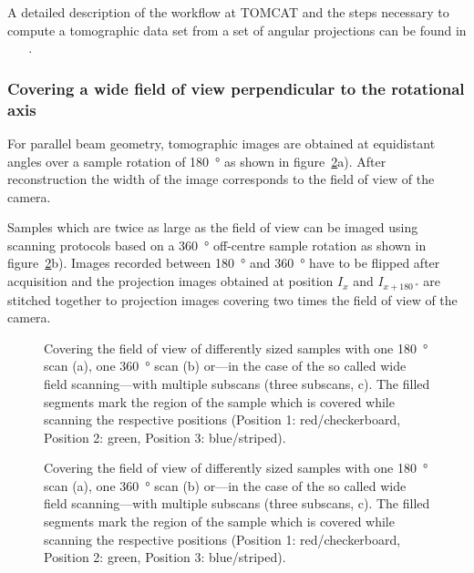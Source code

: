 A detailed description of the workflow at TOMCAT and the steps necessary to compute a tomographic data set from a set of angular projections can be found in%
\ifhtml
	~\citet{Hintermueller2009}
\else
	~
\fi%
.

\subsubsection{Covering a wide field of view perpendicular to the rotational axis}%
For parallel beam geometry, tomographic images are obtained at equidistant angles over a sample rotation of \SI{180}{\degree} as shown in figure~\ref{fig:scanning-possibilities}a). After reconstruction the width of the image corresponds to the field of view of the camera.

Samples which are twice as large as the field of view can be imaged using scanning protocols based on a \SI{360}{\degree} off-centre sample rotation as shown in figure~\ref{fig:scanning-possibilities}b). Images recorded between \SI{180}{\degree} and \SI{360}{\degree} have to be flipped after acquisition and the projection images obtained at position $I_{x}$ and $I_{x+\SI{180}{\degree}}$ are stitched together to projection images covering two times the field of view of the camera.

\ifiucr
	\begin{figure}
		\centering
		\caption{Covering the field of view of differently sized samples with one \SI{180}{\degree} scan (a), one \SI{360}{\degree} scan (b) or---in the case of the so called wide field scanning---with multiple subscans (three subscans, c). The filled segments mark the region of the sample which is covered while scanning the respective positions (Position 1: red/checkerboard, Position 2: green, Position 3: blue/striped).}%
		\label{fig:scanning-possibilities}%
	\end{figure}
\else
	\begin{figure}
		\label{subfig:scanning-possibilities}%
		\caption{Covering the field of view of differently sized samples with one \SI{180}{\degree} scan (a), one \SI{360}{\degree} scan (b) or---in the case of the so called wide field scanning---with multiple subscans (three subscans, c). The filled segments mark the region of the sample which is covered while scanning the respective positions (Position 1: red/checkerboard, Position 2: green, Position 3: blue/striped).}%
		\label{fig:scanning-possibilities}%
	\end{figure}
\fi

